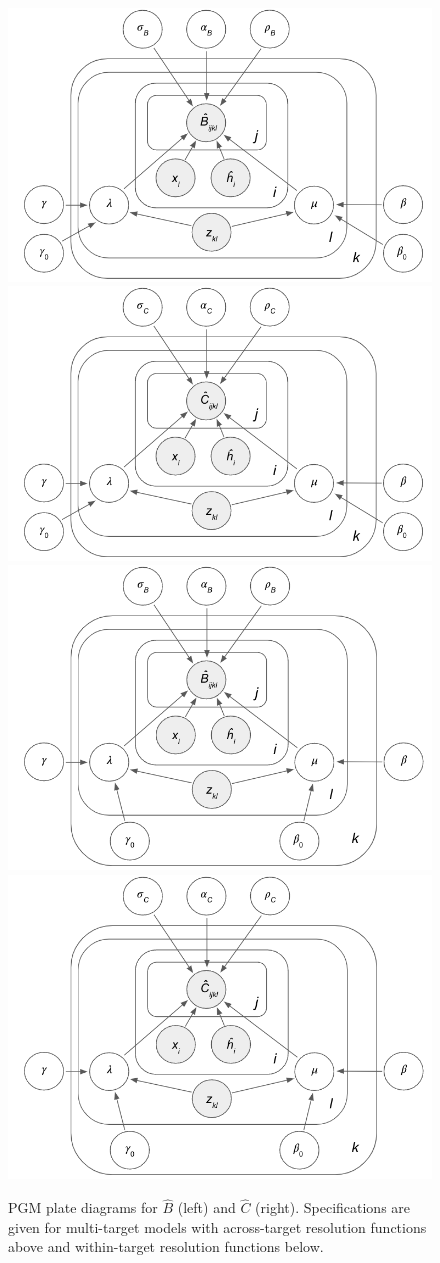 \documentclass[../thesis.tex]{subfiles}
\begin{document}
\begin{figure}
    \centering
    \includegraphics[width=.45\textwidth]{figures/chapter2/LAMP_ATM_B_PGM.png} \includegraphics[width=.45\textwidth]{figures/chapter2/LAMP_ATM_C_PGM.png} \\
    \vspace{10pt}
    \includegraphics[width=.45\textwidth]{figures/chapter2/LAMP_WTM_B_PGM.png} \includegraphics[width=.45\textwidth]{figures/chapter2/LAMP_WTM_C_PGM.png}
    \caption{PGM plate diagrams for $\hat{B}$ (left) and $\hat{C}$ (right). Specifications are given for multi-target models with across-target resolution functions above and within-target resolution functions below.}
    \label{fig:mtm_pgms}
\end{figure}
\end{document}
